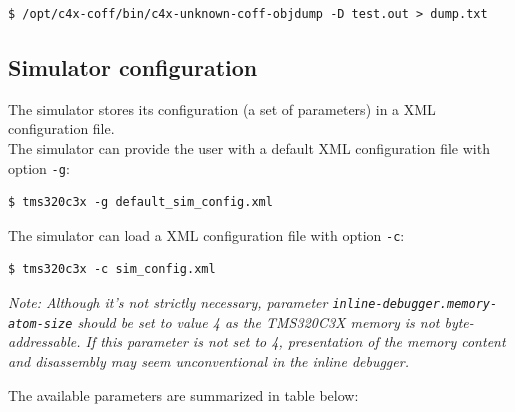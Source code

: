\begin{verbatim}
$ /opt/c4x-coff/bin/c4x-unknown-coff-objdump -D test.out > dump.txt
\end{verbatim}

\subsection{Simulator configuration}
\label{tms320c3x_configuration}

\noindent The simulator stores its configuration (a set of parameters) in a XML configuration file. 
\newline\\
\noindent The simulator can provide the user with a default XML configuration file with option \texttt{-g}:

\begin{verbatim}
$ tms320c3x -g default_sim_config.xml
\end{verbatim}

\noindent The simulator can load a XML configuration file with option \texttt{-c}:

\begin{verbatim}
$ tms320c3x -c sim_config.xml
\end{verbatim}

\noindent \textit{Note: Although it's not strictly necessary, parameter \texttt{inline-debugger.memory-atom-size} should be set to value 4 as the TMS320C3X memory is not byte-addressable. If this parameter is not set to 4, presentation of the memory content and disassembly may seem unconventional in the inline debugger.}

\noindent The available parameters are summarized in table below:

